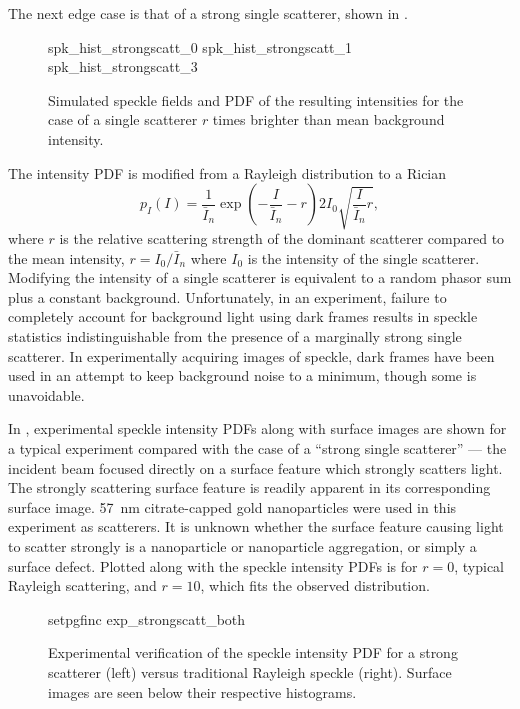The next edge case is that of a strong single scatterer, shown in
.

\begin{figure}[ht]
	\centering
	{spk_hist_strongscatt_0}
	{spk_hist_strongscatt_1}
	{spk_hist_strongscatt_3}
	\caption{Simulated speckle fields and PDF of the resulting intensities for
		the case of a single scatterer $r$ times brighter than mean background
		intensity.}
	\label{fig:strongsinglefig}
\end{figure}
The intensity PDF is modified
from a Rayleigh distribution to a Rician~\cite{goodman2007speckle}
\begin{equation}
	p_I(I) = \frac{1}{\bar{I}_n} \exp\left(-\frac{I}{\bar{I}_n} - r\right) 2 I_0
	\sqrt{\frac{I}{\bar{I}_n} r},
	\label{eqn:ricepdf}
\end{equation}
where $r$ is the relative scattering strength of the dominant scatterer
compared to the mean intensity, $r=I_0/\bar{I}_n$ where $I_0$ is the intensity
of the single scatterer.  Modifying the intensity of a single scatterer is
equivalent to a random phasor sum plus a constant background.  Unfortunately,
in an experiment, failure to completely account for background light using
dark frames results in speckle statistics indistinguishable from the presence
of a marginally strong single scatterer.  In experimentally acquiring images
of speckle, dark frames have been used in an attempt to keep background noise
to a minimum, though some is unavoidable.

In , experimental speckle intensity PDFs
along with surface images are shown for a typical experiment compared with the
case of a ``strong single scatterer'' --- the incident beam focused directly
on a surface feature which strongly scatters light.  The strongly scattering
surface feature is readily apparent in its corresponding surface image.
\SI{57}{\nano\meter} citrate-capped gold nanoparticles were used in this
experiment as scatterers.  It is unknown whether the surface feature causing
light to scatter strongly is a nanoparticle or nanoparticle aggregation, or
simply a surface defect.  Plotted along with the speckle intensity PDFs is
 for $r=0$, typical Rayleigh scattering, and $r=10$,
which fits the observed distribution.

\begin{figure}[!htbp]
	\centering
	{setpgfinc}
	{exp_strongscatt_both}
	\caption{Experimental verification of the speckle intensity PDF for a strong
		scatterer (left) versus traditional Rayleigh speckle (right).  Surface images
		are seen below their respective histograms.}
	\label{fig:strongscattexperiment}
\end{figure}
